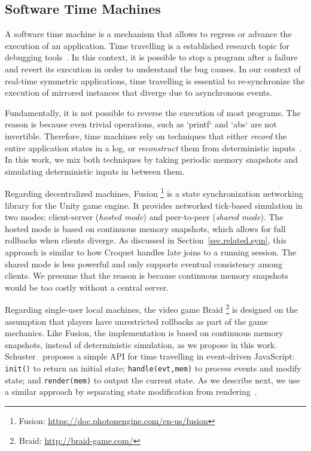 \documentclass[fleqn,10pt]{SelfArx}
\newcommand{\code}[1]  {\texttt{\footnotesize{#1}}}
\begin{document}
\subsection{Software Time Machines}
\label{sec.related.time}


A software time machine is a mechanism that allows to regress or advance the
execution of an application.
%
Time travelling is a established research topic for debugging
tools~\cite{tml.review}.
In this context, it is possible to stop a program after a failure and revert
its execution in order to understand the bug causes.
%
In our context of real-time symmetric applications, time travelling is
essential to re-synchronize the execution of mirrored instances that diverge
due to asynchronous events.

Fundamentally, it is not possible to reverse the execution of most programs.
The reason is because even trivial operations, such as `printf` and `abs` are
not invertible.
Therefore, time machines rely on techniques that either \emph{record} the
entire application states in a log, or \emph{reconstruct} them from
deterministic inputs~\cite{tml.review}.
%
In this work, we mix both techniques by taking periodic memory snapshots and
simulating deterministic inputs in between them.

Regarding decentralized machines, Fusion%
\footnote{Fusion: \url{https://doc.photonengine.com/en-us/fusion}}
is a state synchronization networking library for the Unity game engine.
It provides networked tick-based simulation in two modes: client-server
(\emph{hosted mode}) and peer-to-peer (\emph{shared mode}).
The hosted mode is based on continuous memory snapshots, which allows for
full rollbacks when clients diverge.
As discussed in Section~\ref{sec.related.sym}, this approach is similar to how
Croquet handles late joins to a running session.
The shared mode is less powerful and only supports eventual consistency among
clients.
We presume that the reason is because continuous memory snapshots would be too
costly without a central server.

Regarding single-user local machines, the video game Braid%
\footnote{Braid: \url{http://braid-game.com/}}
is designed on the assumption that players have unrestricted rollbacks as part
of the game mechanics.
Like Fusion, the implementation is based on continuous memory snapshots,
instead of deterministic simulation, as we propose in this work.
%
Schuster~\cite{tml.js} proposes a simple API for time travelling in
event-driven JavaScript:
    \code{init()} to return an initial state;
    \code{handle(evt,mem)} to process events and modify state; and
    \code{render(mem)} to output the current state.
As we describe next, we use a similar approach by separating state modification
from rendering~\cite{tml.alive}.
\end{document}
